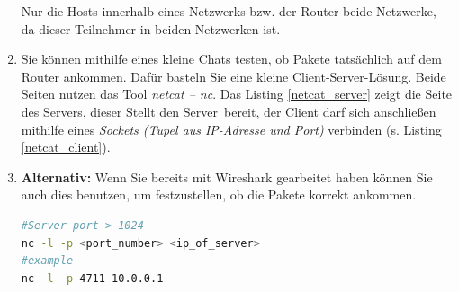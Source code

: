 \documentclass[paper=a4,fontsize=11pt]{scrartcl}%
\numberwithin{equation}{section}
\begin{document}
\begin{enumerate}
\begin{tasks}
		Nur die Hosts innerhalb eines Netzwerks bzw. der Router beide Netzwerke, da dieser Teilnehmer in beiden Netzwerken ist.
		\end{tasks}
		\item Sie können mithilfe eines kleine Chats testen, ob Pakete tatsächlich auf dem Router ankommen. Dafür basteln Sie eine kleine  Client-Server-Lösung. Beide Seiten nutzen das Tool \emph{netcat -- nc}. Das Listing \ref{netcat_server} zeigt die Seite des Servers, dieser Stellt den \glqq Server\grqq\ bereit, der Client darf sich anschließen mithilfe eines \emph{Sockets (Tupel aus IP-Adresse und Port)} verbinden (s. Listing \ref{netcat_client}). 
		\item \textbf{Alternativ:} Wenn Sie bereits mit Wireshark gearbeitet haben können Sie auch dies benutzen, um festzustellen, ob die Pakete korrekt ankommen.\\
		
	\begin{lstlisting}[style=Bash, language=Bash, label={netcat_server}]
#Server port > 1024 
nc -l -p <port_number> <ip_of_server>
#example
nc -l -p 4711 10.0.0.1
		\end{lstlisting}
		

\end{enumerate}
\end{document}
